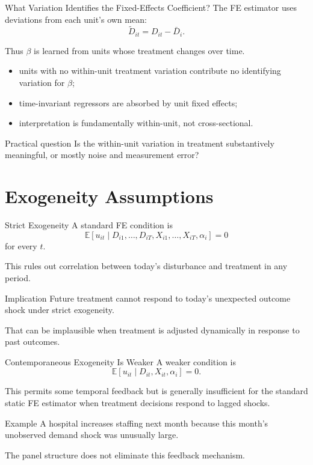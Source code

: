 \documentclass[aspectratio=169,11pt]{beamer}
\newcommand{\E}{\mathbb{E}}
\begin{document}
\begin{frame}{What Variation Identifies the Fixed-Effects Coefficient?}
The FE estimator uses deviations from each unit's own mean:
\[
\widetilde D_{it}=D_{it}-\bar D_i.
\]

Thus \(\beta\) is learned from units whose treatment changes over time.

\begin{itemize}
\item units with no within-unit treatment variation contribute no identifying variation for \(\beta\);
\item time-invariant regressors are absorbed by unit fixed effects;
\item interpretation is fundamentally within-unit, not cross-sectional.
\end{itemize}

\begin{block}{Practical question}
Is the within-unit variation in treatment substantively meaningful, or mostly noise and measurement error?
\end{block}
\end{frame}

\section{Exogeneity Assumptions}

\begin{frame}{Strict Exogeneity}
A standard FE condition is
\[
\E[u_{it}\mid D_{i1},\ldots,D_{iT},X_{i1},\ldots,X_{iT},\alpha_i]=0
\]
for every \(t\).

This rules out correlation between today's disturbance and treatment in any period.

\begin{alertblock}{Implication}
Future treatment cannot respond to today's unexpected outcome shock under strict exogeneity.
\end{alertblock}

That can be implausible when treatment is adjusted dynamically in response to past outcomes.
\end{frame}

\begin{frame}{Contemporaneous Exogeneity Is Weaker}
A weaker condition is
\[
\E[u_{it}\mid D_{it},X_{it},\alpha_i]=0.
\]

This permits some temporal feedback but is generally insufficient for the standard static FE estimator when treatment decisions respond to lagged shocks.

\begin{block}{Example}
A hospital increases staffing next month because this month's unobserved demand shock was unusually large.
\end{block}

The panel structure does not eliminate this feedback mechanism.
\end{frame}
\end{document}
